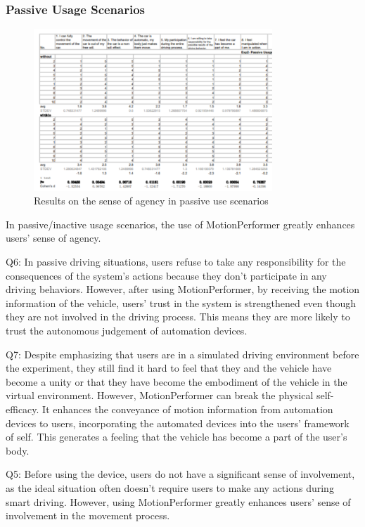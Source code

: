 \subsubsection{Passive Usage Scenarios}
\begin{figure}[h]
\centering
\includegraphics[width=0.8\textwidth]{A_thesis/figures/014-01.png}
\caption{Results on the sense of agency in passive use scenarios}
\end{figure}

In passive/inactive usage scenarios, the use of MotionPerformer greatly enhances users' sense of agency.

Q6: In passive driving situations, users refuse to take any responsibility for the consequences of the system's actions because they don't participate in any driving behaviors. However, after using MotionPerformer, by receiving the motion information of the vehicle, users' trust in the system is strengthened even though they are not involved in the driving process. This means they are more likely to trust the autonomous judgement of automation devices.

Q7: Despite emphasizing that users are in a simulated driving environment before the experiment, they still find it hard to feel that they and the vehicle have become a unity or that they have become the embodiment of the vehicle in the virtual environment. However, MotionPerformer can break the physical self-efficacy. It enhances the conveyance of motion information from automation devices to users, incorporating the automated devices into the users' framework of self. This generates a feeling that the vehicle has become a part of the user's body.

Q5: Before using the device, users do not have a significant sense of involvement, as the ideal situation often doesn't require users to make any actions during smart driving. However, using MotionPerformer greatly enhances users' sense of involvement in the movement process.

